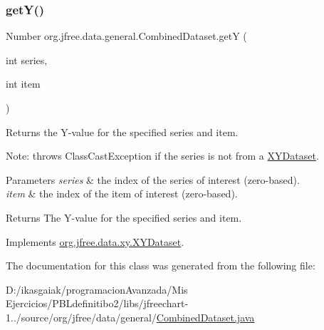 \subsubsection{\texorpdfstring{get\+Y()}{getY()}}
{\footnotesize\ttfamily Number org.\+jfree.\+data.\+general.\+Combined\+Dataset.\+getY (\begin{DoxyParamCaption}\item[{int}]{series,  }\item[{int}]{item }\end{DoxyParamCaption})}

Returns the Y-\/value for the specified series and item. 

Note\+: throws {\ttfamily Class\+Cast\+Exception} if the series is not from a \mbox{\hyperlink{}{X\+Y\+Dataset}}.


\begin{DoxyParams}{Parameters}
{\em series} & the index of the series of interest (zero-\/based). \\
\hline
{\em item} & the index of the item of interest (zero-\/based).\\
\hline
\end{DoxyParams}
\begin{DoxyReturn}{Returns}
The Y-\/value for the specified series and item. 
\end{DoxyReturn}


Implements \mbox{\hyperlink{interfaceorg_1_1jfree_1_1data_1_1xy_1_1_x_y_dataset_aa915867221e0f94021bad3140db5254e}{org.\+jfree.\+data.\+xy.\+X\+Y\+Dataset}}.



The documentation for this class was generated from the following file\+:\begin{DoxyCompactItemize}
\item 
D\+:/ikasgaiak/programacion\+Avanzada/\+Mis Ejercicios/\+P\+B\+Ldefinitibo2/libs/jfreechart-\/1../source/org/jfree/data/general/\mbox{\hyperlink{_combined_dataset_8java}{Combined\+Dataset.\+java}}\end{DoxyCompactItemize}
